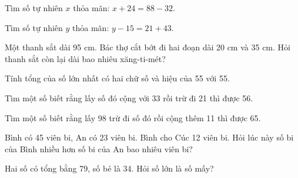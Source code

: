 \begin{ex}
Tìm số tự nhiên $x$ thỏa mãn: $x + 24 = 88 - 32$.
\end{ex}

\begin{ex}
Tìm số tự nhiên $y$ thỏa mãn: $y - 15 = 21 + 43$.
\end{ex}

\begin{ex}
Một thanh sắt dài 95 cm. Bác thợ cắt bớt đi hai đoạn dài 20 cm và 35 cm. Hỏi thanh sắt còn lại dài bao nhiêu xăng-ti-mét?
\end{ex}

\begin{ex}
Tính tổng của số lớn nhất có hai chữ số và hiệu của 55 với 55.
\end{ex}

\begin{ex}
Tìm một số biết rằng lấy số đó cộng với 33 rồi trừ đi 21 thì được 56.
\end{ex}

\begin{ex}
Tìm một số biết rằng lấy 98 trừ đi số đó rồi cộng thêm 11 thì được 65.
\end{ex}

\begin{ex}
Bình có 45 viên bi, An có 23 viên bi. Bình cho Cúc 12 viên bi. Hỏi lúc này số bi của Bình nhiều hơn số bi của An bao nhiêu viên bi?
\end{ex}

\begin{ex}
Hai số có tổng bằng 79, số bé là 34. Hỏi số lớn là số mấy?
\end{ex}

